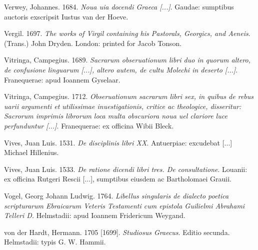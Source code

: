 \begin{styleStandard}
Verwey, Johannes. 1684. \textit{Noua uia docendi Graeca [...]}. Gaudae: sumptibus auctoris exscripsit Iustus van der Hoeve.
\end{styleStandard}

\begin{styleStandard}
Vergil. 1697. \textit{The works of Virgil containing his Pastorals, Georgics, and Aeneis}. (Trans.) John Dryden. London: printed for Jacob Tonson.
\end{styleStandard}

\begin{styleStandard}
Vitringa, Campegius. 1689. \textit{Sacrarum obseruationum libri duo in quorum altero, de confusione linguarum [...], altero autem, de cultu Molechi in deserto [...]}. Franequerae: apud Ioannem Gyselaar.
\end{styleStandard}

\begin{styleStandard}
Vitringa, Campegius. 1712. \textit{Obseruationum sacrarum libri sex, in quibus de rebus uarii argumenti et utilissimae inuestigationis, critice ac theologice, disseritur: Sacrorum imprimis librorum loca multa obscuriora noua uel clariore luce perfunduntur [...]}. Franequerae: ex officina Wibii Bleck.
\end{styleStandard}

\begin{styleStandard}
Vives, Juan Luis. 1531. \textit{De disciplinis libri XX}. Antuerpiae: excudebat [...] Michael Hillenius.
\end{styleStandard}

\begin{styleStandard}
Vives, Juan Luis. 1533. \textit{De ratione dicendi libri tres. De consultatione}. Louanii: ex officina Rutgeri Rescii [...], sumptibus eiusdem ac Bartholomaei Grauii.
\end{styleStandard}

\begin{styleStandard}
Vogel, Georg Johann Ludwig. 1764. \textit{Libellus singularis de dialecto poetica scripturarum Ebraicarum Veteris Testamenti cum epistola Guilielmi Abrahami Telleri D.} Helmstadii: apud Ioannem Fridericum Weygand.
\end{styleStandard}

\begin{styleStandard}
von der Hardt, Hermann. 1705 [1699]. \textit{Studiosus Graecus}. Editio secunda. Helmstadii: typis G. W. Hammii.
\end{styleStandard}

